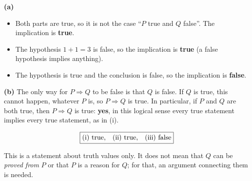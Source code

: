 \textbf{(a)}
\begin{itemize}
\item[(i)] Both parts are true, so it is not the case ``$P$ true and $Q$ false''. The implication is \textbf{true}.
\item[(ii)] The hypothesis $1+1=3$ is false, so the implication is \textbf{true} (a false hypothesis implies anything).
\item[(iii)] The hypothesis is true and the conclusion is false, so the implication is \textbf{false}.
\end{itemize}

\textbf{(b)} The only way for $P\Rightarrow Q$ to be false is that $Q$ is false. If $Q$ is true, this cannot happen, whatever $P$ is, so $P\Rightarrow Q$ is true. In particular, if $P$ and $Q$ are both true, then $P\Rightarrow Q$ is true: \textbf{yes}, in this logical sense every true statement implies every true statement, as in (i).

\[\boxed{\text{(i) true,\quad (ii) true,\quad (iii) false}}\]

This is a statement about truth values only. It does not mean that $Q$ can be \emph{proved from} $P$ or that $P$ is a reason for $Q$; for that, an argument connecting them is needed.
